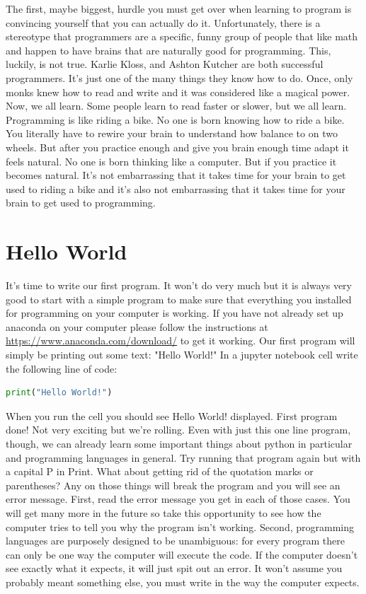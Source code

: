 \documentclass[]{article}
\begin{document}
The first, maybe biggest, hurdle you must get over when learning to program is convincing yourself that you can actually do it.  Unfortunately, there is a stereotype that programmers are a specific, funny group of people that like math and happen to have brains that are naturally good for programming. This, luckily, is not true.  Karlie Kloss, and Ashton Kutcher are both successful programmers. It's just one of the many things they know how to do. Once, only monks knew how to read and write and it was considered like a magical power.  Now, we all learn.  Some people learn to read faster or slower, but we all learn.   Programming is like riding a bike.  No one is born knowing how to ride a bike.  You literally have to rewire your brain to understand how balance to on two wheels. But after you practice enough and give you brain enough time adapt it feels natural. No one is born thinking like a computer. But if you practice it becomes natural. It's not embarrassing that it takes time for your brain to get used to riding a bike and it's also not embarrassing that it takes time for your brain to get used to programming.  

\section{ Hello World }

It's time to write our first program.  It won't do very much but it is always very good to start with a simple program to make sure that everything you installed for programming on your computer is working. If you have not already set up anaconda on your computer please follow the instructions at \href{https://www.anaconda.com/download/}{https://www.anaconda.com/download/} to get it working. Our first program will simply be printing out some text: "Hello World!"  In a jupyter notebook cell write the following line of code:
\begin{lstlisting}[language=Python]
    print("Hello World!")
\end{lstlisting}
When you run the cell you should see Hello World! displayed.  First program done!  Not very exciting but we're rolling. Even with just this one line program, though, we can already learn some important things about python in particular and programming languages in general. Try running that program again but with a capital P in Print.  What about getting rid of the quotation marks or parentheses?  Any on those things will break the program and you will see an error message.  First, read the error message you get in each of those cases.  You will get many more in the future so take this opportunity to see how the computer tries to tell you why the program isn't working. Second, programming languages are purposely designed to be unambiguous: for every program there can only be one way the computer will execute the code. If the computer doesn't see exactly what it expects, it will just spit out an error. It won't assume you probably meant something else, you must write in the way the computer expects.  
\end{document}
